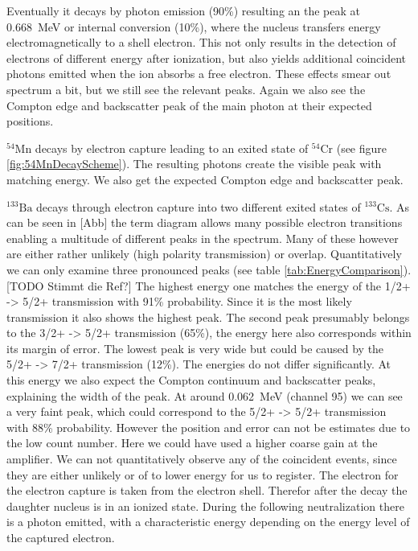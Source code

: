 Eventually it decays by photon emission (90\%) resulting an the peak at \SI{0.668}{\mega\electronvolt} or internal conversion (10\%), where the nucleus transfers energy electromagnetically to a shell electron.
This not only results in the detection of electrons of different energy after ionization, but also yields additional coincident photons emitted when the ion absorbs a free electron.
These effects smear out spectrum a bit, but we still see the relevant peaks.
Again we also see the Compton edge and backscatter peak of the main photon at their expected positions.
%
\par
\textbf{$^{54}\text{Mn}$} decays by electron capture leading to an exited state of $^{54}\text{Cr}$ (see figure \ref{fig:54MnDecayScheme}).
The resulting photons create the visible peak with matching energy.
We also get the expected Compton edge and backscatter peak.
%
\par
\textbf{$^{133}\text{Ba}$} decays through electron capture into two different exited states of $^{133}\text{Cs}$.
As can be seen in [Abb] the term diagram allows many possible electron transitions enabling a multitude of different peaks in the spectrum.
Many of these however are either rather unlikely (high polarity transmission) or overlap.
Quantitatively we can only examine three pronounced peaks (see table \ref{tab:EnergyComparison}). [TODO Stimmt die Ref?]
The highest energy one matches the energy of the 1/2+ -> 5/2+ transmission with 91\% probability.
Since it is the most likely transmission it also shows the highest peak.
The second peak presumably belongs to the 3/2+ -> 5/2+ transmission (65\%), the energy here also corresponds within its margin of error.
The lowest peak is very wide but could be caused by the 5/2+ -> 7/2+ transmission (12\%).
The energies do not differ significantly.
At this energy we also expect the Compton continuum and backscatter peaks, explaining the width of the peak.
At around \SI{0.062}{\mega\electronvolt} (channel 95) we can see a very faint peak, which could correspond to the 5/2+ -> 5/2+ transmission with 88\% probability.
However the position and error can not be estimates due to the low count number.
Here we could have used a higher coarse gain at the amplifier.
We can not quantitatively observe any of the coincident events, since they are either unlikely or of to lower energy for us to register.
The electron for the electron capture is taken from the electron shell.
Therefor after the decay the daughter nucleus is in an ionized state.
During the following neutralization there is a photon emitted, with a characteristic energy depending on the energy level of the captured electron.
